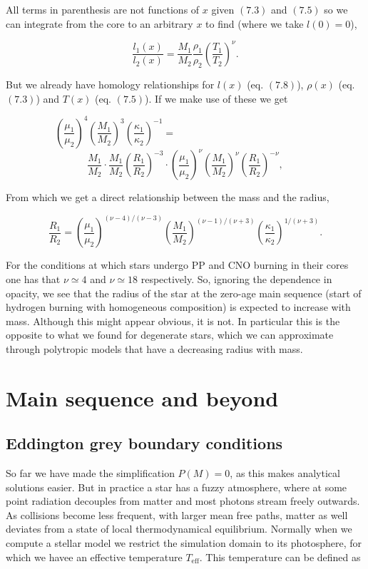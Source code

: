 \documentclass[twocolumn]{article}
\begin{document}
All terms in parenthesis are not functions of \(x\) given \((7.3)\) and
\((7.5)\) so we can integrate from the core to an arbitrary \(x\) to
find (where we take \(l(0)=0\)),

\[\frac{l_1(x)}{l_2(x)}=\frac{M_1}{M_2}\frac{\rho_1}{\rho_2}\left(\frac{T_1}{T_2}\right)^\nu.\]

But we already have homology relationships for \(l(x)\) (eq. \((7.8)\)),
\(\rho(x)\) (eq. \((7.3)\)) and \(T(x)\) (eq. \((7.5)\)). If we make use
of these we get

\[\left(\frac{\mu_1}{\mu_2}\right)^4\left(\frac{M_1}{M_2}\right)^3\left(\frac{\kappa_1}{\kappa_2}\right)^{-1}=\qquad\qquad\qquad\qquad\qquad\qquad\qquad\]
\[\frac{M_1}{M_2}\cdot \frac{M_1}{M_2}\left(\frac{R_1}{R_2}\right)^{-3}\cdot \left(\frac{\mu_1}{\mu_2}\right)^\nu\left(\frac{M_1}{M_2}\right)^\nu\left(\frac{R_1}{R_2}\right)^{-\nu},\]

From which we get a direct relationship between the mass and the radius,

\[\frac{R_1}{R_2}=\left(\frac{\mu_1}{\mu_2}\right)^{(\nu-4)/(\nu-3)}\left(\frac{M_1}{M_2}\right)^{(\nu-1)/(\nu+3)}\left(\frac{\kappa_1}{\kappa_2}\right)^{1/(\nu+3)}.\]

For the conditions at which stars undergo PP and CNO burning in their
cores one has that \(\nu\simeq 4\) and \(\nu\simeq 18\) respectively.
So, ignoring the dependence in opacity, we see that the radius of the
star at the zero-age main sequence (start of hydrogen burning with
homogeneous composition) is expected to increase with mass. Although
this might appear obvious, it is not. In particular this is the opposite
to what we found for degenerate stars, which we can approximate through
polytropic models that have a decreasing radius with mass.

\hypertarget{main-sequence-and-beyond}{%
\section{Main sequence and beyond}\label{main-sequence-and-beyond}}

\hypertarget{eddington-grey-boundary-conditions}{%
\subsection{Eddington grey boundary
conditions}\label{eddington-grey-boundary-conditions}}

So far we have made the simplification \(P(M)=0\), as this makes
analytical solutions easier. But in practice a star has a fuzzy
atmosphere, where at some point radiation decouples from matter and most
photons stream freely outwards. As collisions become less frequent, with
larger mean free paths, matter as well deviates from a state of local
thermodynamical equilibrium. Normally when we compute a stellar model we
restrict the simulation domain to its photosphere, for which we havee an
effective temperature \(T_\mathrm{eff}\). This temperature can be
defined as
\end{document}
